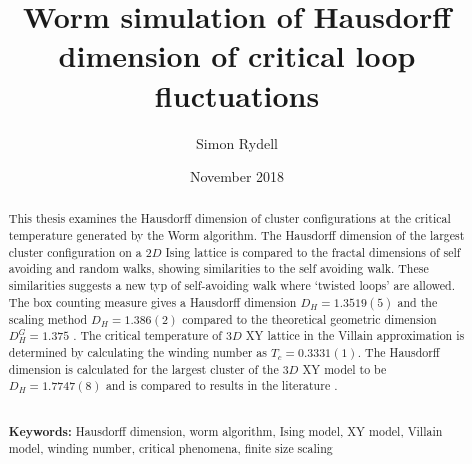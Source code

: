 \documentclass[nocoverpage,swedish,g5paper]{thesis}
\title{Worm simulation of Hausdorff dimension of critical loop fluctuations}
\author{Simon Rydell}
\date{November 2018}
\begin{document}

\begin{abstract}

This thesis examines the Hausdorff dimension of cluster configurations at the critical temperature generated by the Worm algorithm. The Hausdorff dimension of the largest cluster configuration on a $2D$ Ising lattice is compared to the fractal dimensions of self avoiding and random walks, showing similarities to the self avoiding walk. These similarities suggests a new typ of self-avoiding walk where `twisted loops' are allowed. The box counting measure \cite{strogatz:dynamics_chaos} gives a Hausdorff dimension $D_H = 1.3519(5)$ and the scaling method \cite{Hove:hausdorff_crit_fluctuations} $D_H = 1.386(2)$ compared to the theoretical geometric dimension $D_H^{G} = 1.375$ \cite{Duplantier:GeoHausdorff}. The critical temperature of $3D$ XY lattice in the Villain approximation is determined by calculating the winding number as $T_c = 0.3331(1)$. The Hausdorff dimension is calculated for the largest cluster of the $3D$ XY model to be $D_H = 1.7747(8)$ and is compared to results in the literature \cite{Prokofev:comment_on_hove_hausdorff_crit_fluct}\cite{Hove:hausdorff_crit_fluctuations}.
\\ \noindent \strut \\
\textbf{Keywords:} Hausdorff dimension, worm algorithm, Ising model, XY model, Villain model, winding number, critical phenomena, finite size scaling

\newpage




\end{abstract}
\end{document}
